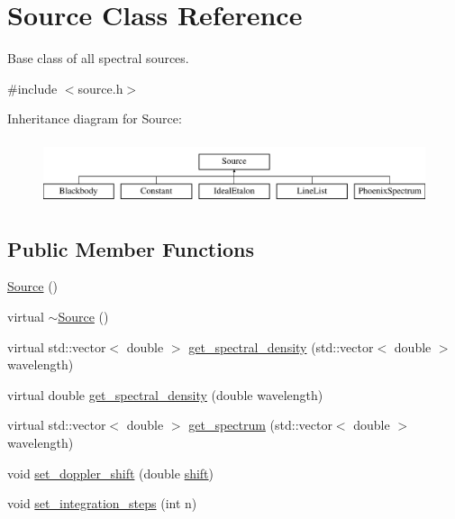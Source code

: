\hypertarget{class_source}{}\section{Source Class Reference}
\label{class_source}


Base class of all spectral sources.  




{\ttfamily \#include $<$source.\+h$>$}

Inheritance diagram for Source\+:\begin{figure}[H]
\begin{center}
\leavevmode
\includegraphics[height=1.898305cm]{class_source}
\end{center}
\end{figure}
\subsection*{Public Member Functions}
\begin{DoxyCompactItemize}
\item 
\hyperlink{class_source_a660c0a4b8b8f8402568bef86f2cb2fbb}{Source} ()
\item 
virtual \hyperlink{class_source_ac5104a4d66641ae529419b47da4a1473}{$\sim$\+Source} ()
\item 
virtual std\+::vector$<$ double $>$ \hyperlink{class_source_a165b9f7281915b5fdf5ce3278fb1e3aa}{get\+\_\+spectral\+\_\+density} (std\+::vector$<$ double $>$ wavelength)
\item 
virtual double \hyperlink{class_source_a546ae8ec1ae47e888c74f146278e19af}{get\+\_\+spectral\+\_\+density} (double wavelength)
\item 
virtual std\+::vector$<$ double $>$ \hyperlink{class_source_ab5d90ab3a4cfb8403803d88ce8b9f0f8}{get\+\_\+spectrum} (std\+::vector$<$ double $>$ wavelength)
\item 
void \hyperlink{class_source_a0bd707ab373bc9b957cb30d577af8a07}{set\+\_\+doppler\+\_\+shift} (double \hyperlink{class_source_a33104a788577b65918c95d240110c082}{shift})
\item 
void \hyperlink{class_source_a5d2eac20504111cbee890666e052e4df}{set\+\_\+integration\+\_\+steps} (int n)
\end{DoxyCompactItemize}
